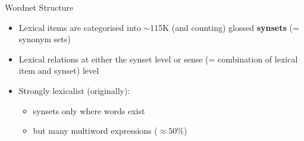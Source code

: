 \documentclass{beamer}
\begin{document}
\begin{frame}{Wordnet Structure}
\begin{itemize}
\item Lexical items are categorised into $\sim$115K (and counting) glossed \textbf{synsets} (= synonym sets)

\item Lexical relations at either the synset level or sense (=
  combination of lexical item and synset) level 
\item Strongly lexicalist (originally):
  \begin{itemize}
  \item synsets only where words exist
  \item but many multiword expressions ($\approx 50\%$)
  \end{itemize}


\end{itemize}

\end{frame}
\end{document}
